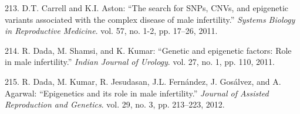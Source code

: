 \documentclass[12pt,a4paper,twoside]{ugathesis}
\theoremstyle{definition}
\theoremstyle{definition}
\theoremstyle{definition}
\theoremstyle{remark}
\begin{document}
\hypertarget{ref-Carrell2011}{}
213. D.T. Carrell and K.I. Aston: ``The search for SNPs, CNVs, and
epigenetic variants associated with the complex disease of male
infertility.'' \emph{Systems Biology in Reproductive Medicine}. vol. 57,
no. 1-2, pp. 17--26, 2011.

\hypertarget{ref-Dada2011}{}
214. R. Dada, M. Shamsi, and K. Kumar: ``Genetic and epigenetic factors:
Role in male infertility.'' \emph{Indian Journal of Urology}. vol. 27,
no. 1, pp. 110, 2011.

\hypertarget{ref-Dada2012}{}
215. R. Dada, M. Kumar, R. Jesudasan, J.L. Fernández, J. Gosálvez, and
A. Agarwal: ``Epigenetics and its role in male infertility.''
\emph{Journal of Assisted Reproduction and Genetics}. vol. 29, no. 3,
pp. 213--223, 2012.


\end{document}
